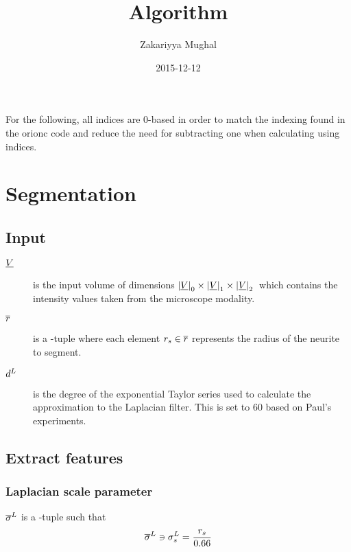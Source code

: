 \documentclass[12pt]{article}
\title{Algorithm}
\author{Zakariyya Mughal}
\date{2015-12-12}
\begin{document}
\maketitle
\tableofcontents

For the following, all indices are 0-based in order to match the
indexing found in the \gls{orionc} code and reduce the need for
subtracting one when calculating using indices.

\section{Segmentation}

\subsection{Input}

\newcommand{\foobar}[1]{\bm{#1}}

\begin{description}
	\item[\(\underline{V}{}\)] is the input volume of dimensions
		\(\left|\underline{V}\right|_0 \times \left|\underline{V}\right|_1 \times \left|\underline{V}\right|_2{}\) which contains the intensity values taken
		from the microscope modality.
	\item[\(\overline{r}{}\)] is a \Dim{\RadiiScalesName}-tuple where each element
		\(r_{s} \in \overline{r}\)
		represents the radius of the neurite to segment.
	\item[\(d^{L}{}\)] is the degree of the
		exponential Taylor series used to calculate the approximation
		to the Laplacian filter. This is set to \(\num{60}\) based on Paul's
		experiments.

\end{description}

\subsection{Extract features}

\subsubsection{Laplacian scale parameter}

\(\overline{\sigma}^{L}\) is a \Dim{\RadiiScalesName}-tuple such that
\begin{equation*}
	\overline{\sigma}^{L} \ni \sigma^{L}_{s}{} = \frac{r_{s}{}}{\num{0.66}}
\end{equation*}
\end{document}
